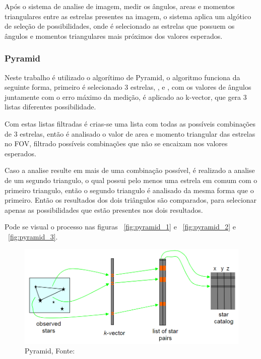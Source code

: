 Após o sistema de analise de imagem, medir os ângulos, areas e momentos triangulares entre as estrelas presentes na imagem, 
o sistema aplica um algótico de seleção de possibilidades, 
onde é selecionado as estrelas que possuem os ângulos e momentos triangulares mais próximos dos valores esperados.

\subsubsection{Pyramid}

Neste trabalho é utilizado o algorítimo de Pyramid, 
o algoritmo funciona da seguinte forma, 
primeiro é selecionado 3 estrelas, \textalpha, \textbeta  e \textgamma, 
com os valores de ângulos juntamente com o erro máximo da medição, é aplicado ao k-vector,
que gera 3 listas diferentes possibilidade.

Com estas listas filtradas é crias-se uma lista com todas as possíveis combinações de 3 estrelas, 
então é analisado o valor de area e momento triangular das estrelas no FOV, filtrado possíveis combinações que não se encaixam nos valores esperados.

Caso a analise resulte em mais de uma combinação possível, é realizado a analise de um segundo triangulo, 
o qual possui pelo menos uma estrela em comum com o primeiro triangulo, 
então o segundo triangulo é analisado da mesma forma que o primeiro.
Então os resultados dos dois triângulos são comparados, para selecionar apenas as possibilidades que estão presentes nos dois resultados.

Pode se visual o processo nas figuras ~\ref{fig:pyramid_1} e ~\ref{fig:pyramid_2} e ~\ref{fig:pyramid_3}.
\begin{figure}[H]
    \centering
    \includegraphics[width=1\textwidth]{images/Pyramid_01.png}
    \caption{Pyramid, Fonte: ~\cite[]{Fialho}}
    \label{fig:pyramid_01}
\end{figure}


